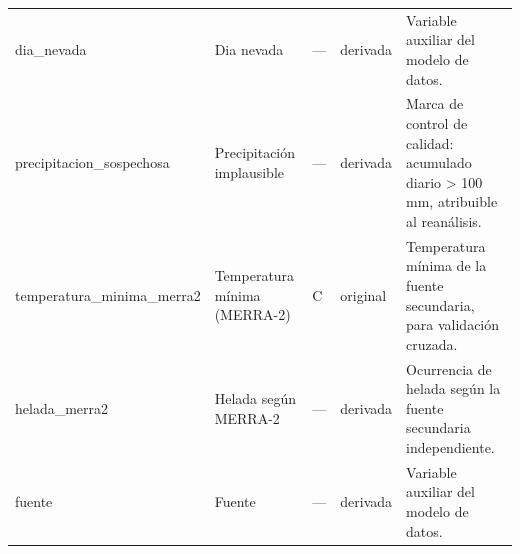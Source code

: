 \begin{longtable}{>{\raggedright\arraybackslash}p{2.8cm}>{\raggedright\arraybackslash}p{2.9cm}>{\centering\arraybackslash}p{1.2cm}>{\centering\arraybackslash}p{1.5cm}>{\raggedright\arraybackslash}p{5.5cm}}
dia\_\allowbreak{}nevada & Dia nevada & — & derivada & Variable auxiliar del modelo de datos. \\
precipitacion\_\allowbreak{}sospechosa & Precipitación implausible & — & derivada & Marca de control de calidad: acumulado diario > 100 mm, atribuible al reanálisis. \\
temperatura\_\allowbreak{}minima\_\allowbreak{}merra2 & Temperatura mínima (MERRA-2) & \textdegree{}C & original & Temperatura mínima de la fuente secundaria, para validación cruzada. \\
helada\_\allowbreak{}merra2 & Helada según MERRA-2 & — & derivada & Ocurrencia de helada según la fuente secundaria independiente. \\
fuente & Fuente & — & derivada & Variable auxiliar del modelo de datos. \\
\end{longtable}